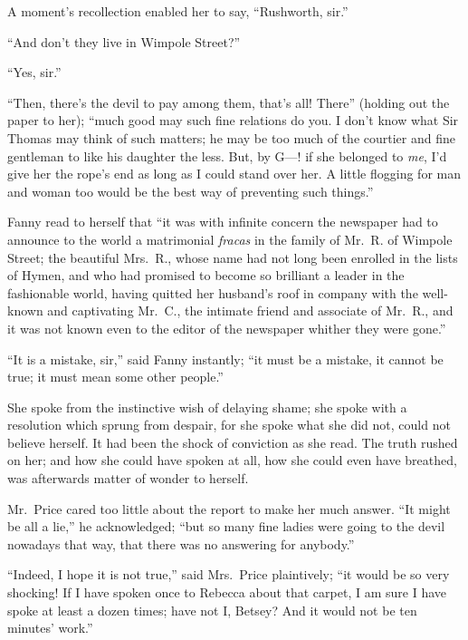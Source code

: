 \documentclass{article}
\begin{document}
A moment's recollection enabled her to say, ``Rushworth, sir.''

``And don't they live in Wimpole Street?''

``Yes, sir.''

``Then, there's the devil to pay among them, that's all!
There'' (holding out the paper to her); ``much good may such
fine relations do you.  I don't know what Sir Thomas may
think of such matters; he may be too much of the courtier
and fine gentleman to like his daughter the less.  But,
by G---! if she belonged to \emph{me}, I'd give her the rope's end
as long as I could stand over her.  A little flogging for
man and woman too would be the best way of preventing such things.''

Fanny read to herself that ``it was with infinite concern
the newspaper had to announce to the world a matrimonial
\emph{fracas} in the family of Mr.\ R. of Wimpole Street;
the beautiful Mrs.\ R., whose name had not long been
enrolled in the lists of Hymen, and who had promised
to become so brilliant a leader in the fashionable world,
having quitted her husband's roof in company with the
well-known and captivating Mr.\ C., the intimate friend
and associate of Mr.\ R., and it was not known even
to the editor of the newspaper whither they were gone.''

``It is a mistake, sir,'' said Fanny instantly; ``it must be
a mistake, it cannot be true; it must mean some other people.''

She spoke from the instinctive wish of delaying shame;
she spoke with a resolution which sprung from despair,
for she spoke what she did not, could not believe herself.
It had been the shock of conviction as she read.  The truth
rushed on her; and how she could have spoken at all, how she
could even have breathed, was afterwards matter of wonder
to herself.

Mr.\ Price cared too little about the report to make her
much answer.  ``It might be all a lie,'' he acknowledged;
``but so many fine ladies were going to the devil nowadays
that way, that there was no answering for anybody.''

``Indeed, I hope it is not true,'' said Mrs.\ Price plaintively;
``it would be so very shocking!  If I have spoken once
to Rebecca about that carpet, I am sure I have spoke at
least a dozen times; have not I, Betsey?  And it would
not be ten minutes' work.''
\end{document}
